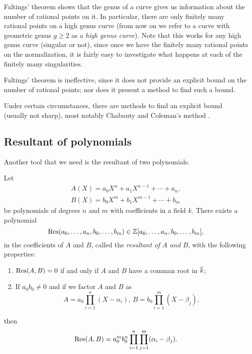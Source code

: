 Faltings' theorem shows that the genus of a curve gives us information
about the number of rational points on it. In particular, there are
only finitely many rational points on a high genus curve (from now on
we refer to a curve with geometric genus $g \ge 2$ as a \emph{high
  genus curve}). Note that this works for any high genus curve
(singular or not), since once we have the finitely many rational
points on the normalization, it is fairly easy to investigate what
happens at each of the finitely many singularities.

\begin{remark}
  Faltings' theorem is ineffective, since it does not provide an
  explicit bound on the number of rational points; nor does it present
  a method to find such a bound.

  Under certain circumstances, there are methods to find an explicit
  bound (usually not sharp), most notably Chabauty and Coleman's
  method \cite{MR808103}.
\end{remark}

\subsection{Resultant of polynomials}

Another tool that we need is the resultant of two polynomials.

\begin{proposition}
  \label{prop:res}
  Let
  \[
  \begin{gathered}
    A(X) = a_0 X^n + a_1 X^{n-1} + \cdots + a_n,\\
    B(X) = b_0 X^m + b_1 X^{m-1} + \cdots + b_m
  \end{gathered}
  \]
  be polynomials of degrees $n$ and $m$ with coefficients
  in a field $k$. There exists a polynomial
  \[
  \mathrm{Res}(a_0, \dots, a_n, b_0, \dots, b_m) \in \mathbb{Z}[a_0, \dots, a_n, b_0,
  \dots, b_m],
  \]
  in the coefficients of $A$ and $B$, called the \emph{resultant of
    $A$ and $B$}, with the following properties:
  \begin{enumerate}
  \item $\mathrm{Res}(A, B) = 0$ if and only if $A$ and $B$ have a comman root
    in $\overline{k}$;

  \item If $a_0 b_0 \ne 0$ and if we factor $A$ and $B$ as
    \[
    A = a_0 \prod_{i=1}^n (X - \alpha_i),\,
    B = b_0 \prod_{i=1}^m (X - \beta_j),
    \]
  \end{enumerate}
  then
  \[
  \mathrm{Res}(A, B) = a_0^m b_0^n \prod_{i=1}^n \prod_{j=1}^m (\alpha_i -
  \beta_j).
  \]
\end{proposition}

